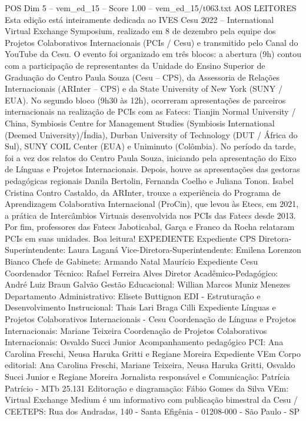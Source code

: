 \begin{textsample}{POS Dim 5 – vem\_ed\_15 – Score 1.00 – vem\_ed\_15/t063.txt}  \label{ex:f5_pos_124}
AOS LEITORES Esta edição está inteiramente dedicada ao IVES Cesu 2022 – International Virtual Exchange Symposium, realizado em 8 de dezembro pela equipe dos Projetos Colaborativos Internacionais (PCIs / Cesu) e transmitido pelo Canal do YouTube da Cesu.
O evento foi organizado em três blocos: a abertura (9h) contou com a participação de representantes da Unidade do Ensino Superior de Graduação do Centro Paula Souza (Cesu – CPS), da Assessoria de Relações Internacionais (ARInter – CPS) e da State University of New York (SUNY / EUA).
No segundo bloco (9h30 às 12h), ocorreram apresentações de parceiros internacionais na realização de PCIs com as Fatecs: Tianjin Normal University / China, Symbiosis Centre for Management Studies (Symbiosis International (Deemed University)/Índia), Durban University of Technology (DUT / África do Sul), SUNY COIL Center (EUA) e Uniminuto (Colômbia).
No período da tarde, foi a vez dos relatos do Centro Paula Souza, iniciando pela apresentação do Eixo de Línguas e Projetos Internacionais.
Depois, houve as apresentações das gestoras pedagógicas regionais Danila Bertolin, Fernanda Coelho e Juliana Tonon.
Isabel Cristina Contro Castaldo, da ARInter, trouxe a experiência do Programa de Aprendizagem Colaborativa Internacional (ProCin), que levou às Etecs, em 2021, a prática de Intercâmbios Virtuais desenvolvida nos PCIs das Fatecs desde 2013.
Por fim, professores das Fatecs Jaboticabal, Garça e Franco da Rocha relataram PCIs em suas unidades.
Boa leitura!
EXPEDIENTE Expediente CPS Diretora-Superintendente: Laura Laganá Vice-Diretora-Superintendente: Emilena Lorenzon Bianco Chefe de Gabinete: Armando Natal Maurício Expediente Cesu Coordenador Técnico: Rafael Ferreira Alves Diretor Acadêmico-Pedagógico: André Luiz Braun Galvão Gestão Educacional: Willian Marcos Muniz Menezes Departamento Administrativo: Elisete Buttignon EDI - Estruturação e Desenvolvimento Instrucional: Thais Lari Braga Cilli Expediente Línguas e Projetos Colaborativos Internacionais - Cesu Coordenação de Línguas e Projetos Internacionais: Mariane Teixeira Coordenação de Projetos Colaborativos Internacionais: Osvaldo Succi Junior Acompanhamento pedagógico PCI: Ana Carolina Freschi, Neusa Haruka Gritti e Regiane Moreira Expediente VEm Corpo editorial: Ana Carolina Freschi, Mariane Teixeira, Neusa Haruka Gritti, Osvaldo Succi Junior e Regiane Moreira Jornalista responsável e Comunicação: Patrícia Patrício - MTb 25.131 Editoração e diagramação: Fábio Gomes da Silva VEm: Virtual Exchange Medium é um informativo com publicação bimestral da Cesu / CEETEPS: Rua dos Andradas, 140 - Santa Efigênia - 01208-000 - São Paulo - SP

\end{textsample}
